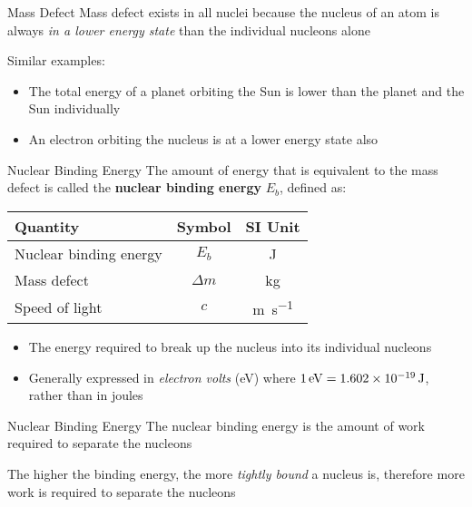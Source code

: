 \documentclass[12pt,compress,aspectratio=169]{beamer}
\begin{document}
\begin{frame}{Mass Defect}
  Mass defect exists in all nuclei because the nucleus of an atom is always
  \emph{in a lower energy state} than the individual nucleons alone
  
  \vspace{.25in}Similar examples:
  \begin{itemize}
  \item The total energy of a planet orbiting the Sun is lower than the planet
    and the Sun individually
  \item An electron orbiting the nucleus is at a lower energy state also
  \end{itemize}
\end{frame}



\begin{frame}{Nuclear Binding Energy}
  The amount of energy that is equivalent to the mass defect is called the
  \textbf{nuclear binding energy} $E_b$, defined as:

  \begin{center}
    \begin{tabular}{l|c|c}
      \rowcolor{pink}
      \textbf{Quantity}      & \textbf{Symbol} & \textbf{SI Unit} \\ \hline
      Nuclear binding energy & $E_b$      & \si{\joule}\\
      Mass defect            & $\Delta m$ & \si{\kilo\gram}\\
      Speed of light         & $c$        & \si{\metre\per\second}
    \end{tabular}
  \end{center}
  \begin{itemize}
  \item The energy required to break up the nucleus into its individual
    nucleons
  \item Generally expressed in \emph{electron volts} (\si{\electronvolt})
    where $\SI1{\electronvolt}=\SI{1.602e-19}{\joule}$, rather than in joules
  \end{itemize}
\end{frame}



\begin{frame}{Nuclear Binding Energy}
  The nuclear binding energy is the amount of work required to separate the
  nucleons
  \begin{center}
  \end{center}
  The higher the binding energy, the more \emph{tightly bound} a nucleus is,
  therefore more work is required to separate the nucleons
\end{frame}
\end{document}
